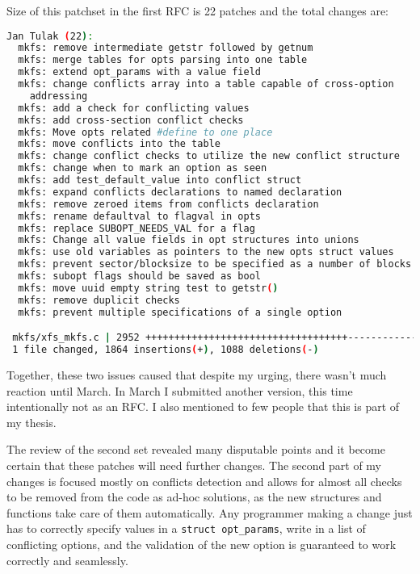 Size of this patchset in the first RFC is 22 patches and the total changes are:
\begin{lstlisting}[frame=none, basicstyle=\footnotesize\ttfamily, language=Bash, numbers=none, numberstyle=\tiny\color{black},caption= {Git statistics for the second patchset~\cite{secondSetRFC}.}]
Jan Tulak (22):
  mkfs: remove intermediate getstr followed by getnum
  mkfs: merge tables for opts parsing into one table
  mkfs: extend opt_params with a value field
  mkfs: change conflicts array into a table capable of cross-option
    addressing
  mkfs: add a check for conflicting values
  mkfs: add cross-section conflict checks
  mkfs: Move opts related #define to one place
  mkfs: move conflicts into the table
  mkfs: change conflict checks to utilize the new conflict structure
  mkfs: change when to mark an option as seen
  mkfs: add test_default_value into conflict struct
  mkfs: expand conflicts declarations to named declaration
  mkfs: remove zeroed items from conflicts declaration
  mkfs: rename defaultval to flagval in opts
  mkfs: replace SUBOPT_NEEDS_VAL for a flag
  mkfs: Change all value fields in opt structures into unions
  mkfs: use old variables as pointers to the new opts struct values
  mkfs: prevent sector/blocksize to be specified as a number of blocks
  mkfs: subopt flags should be saved as bool
  mkfs: move uuid empty string test to getstr()
  mkfs: remove duplicit checks
  mkfs: prevent multiple specifications of a single option

 mkfs/xfs_mkfs.c | 2952 +++++++++++++++++++++++++++++++++++--------------------
 1 file changed, 1864 insertions(+), 1088 deletions(-)

\end{lstlisting}

Together, these two issues caused that despite my urging, there wasn't much
reaction until March. In March I submitted another version, this time
intentionally not as an RFC. I also mentioned to few people that this is
part of my thesis.

The review of the second set revealed many disputable points and it become
certain that these patches will need further changes. The second part of
my changes is focused mostly on conflicts detection and allows for almost
all checks to be removed from the code as ad-hoc solutions, as the new
structures and functions take care of them automatically. Any programmer
making a change just has to correctly specify values in a {\tt struct
opt\_params}, write in a list of conflicting options, and the validation of
the new option is guaranteed to work correctly and seamlessly.

